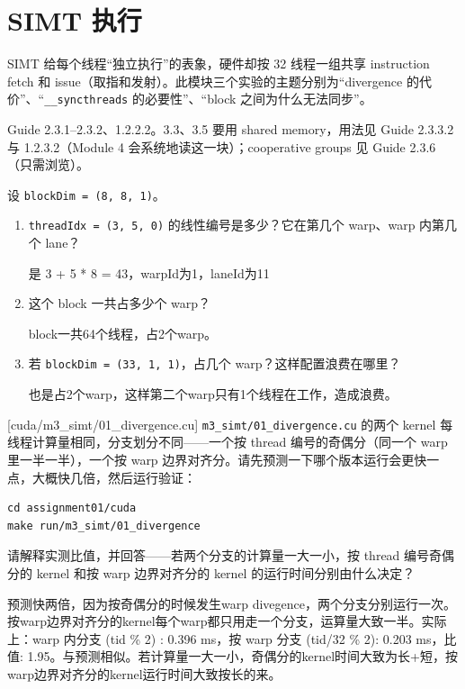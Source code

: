 \documentclass[11pt,a4paper,fontset=none]{ctexart}
\begin{document}
\section{SIMT 执行}

SIMT 给每个线程“独立执行”的表象，硬件却按 32 线程一组共享 instruction fetch 和 issue（取指和发射）。此模块三个实验的主题分别为“divergence 的代价”、“\texttt{\_\_syncthreads} 的必要性”、“block 之间为什么无法同步”。

\begin{reading}
Guide 2.3.1--2.3.2、1.2.2.2。3.3、3.5 要用 shared memory，用法见 Guide 2.3.3.2 与 1.2.3.2（Module 4 会系统地读这一块）；cooperative groups 见 Guide 2.3.6（只需浏览）。
\end{reading}

设 \texttt{blockDim = (8, 8, 1)}。
\begin{enumerate}[label=(\alph*)]
  \item \texttt{threadIdx = (3, 5, 0)} 的线性编号是多少？它在第几个 warp、warp 内第几个 lane？
  
  是 3 + 5 * 8 = 43，warpId为1，laneId为11

  \item 这个 block 一共占多少个 warp？

  block一共64个线程，占2个warp。

  \item 若 \texttt{blockDim = (33, 1, 1)}，占几个 warp？这样配置浪费在哪里？

  也是占2个warp，这样第二个warp只有1个线程在工作，造成浪费。

\end{enumerate}

[cuda/m3\_simt/01\_divergence.cu]
\texttt{m3\_simt/01\_divergence.cu} 的两个 kernel 每线程计算量相同，分支划分不同——一个按 thread 编号的奇偶分（同一个 warp 里一半一半），一个按 warp 边界对齐分。请先预测一下哪个版本运行会更快一点，大概快几倍，然后运行验证：

\begin{lstlisting}
cd assignment01/cuda
make run/m3_simt/01_divergence
\end{lstlisting}

请解释实测比值，并回答——若两个分支的计算量一大一小，按 thread 编号奇偶分的 kernel 和按 warp 边界对齐分的 kernel 的运行时间分别由什么决定？

预测快两倍，因为按奇偶分的时候发生warp divegence，两个分支分别运行一次。按warp边界对齐分的kernel每个warp都只用走一个分支，运算量大致一半。实际上：warp 内分支 (tid \% 2) : 0.396 ms，按 warp 分支 (tid/32 \% 2):  0.203 ms，比值: 1.95。与预测相似。若计算量一大一小，奇偶分的kernel时间大致为长+短，按warp边界对齐分的kernel运行时间大致按长的来。
\end{document}
